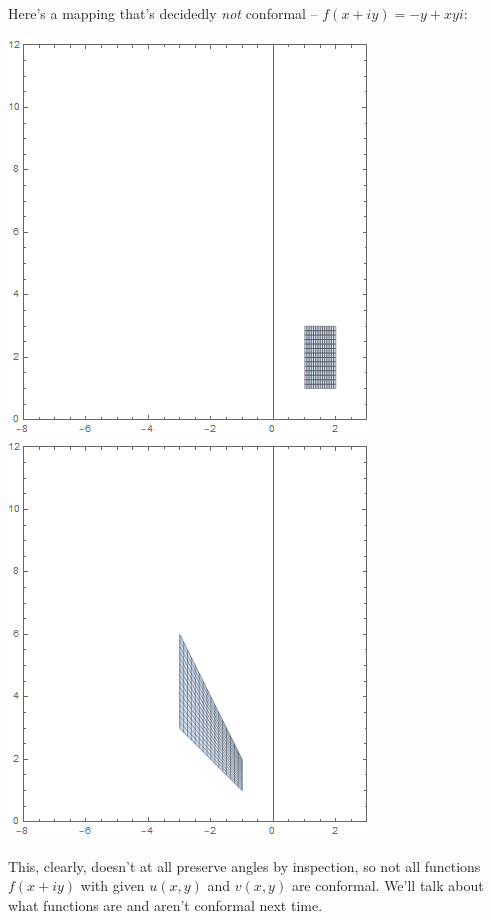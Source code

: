 \documentclass[12pt]{scrartcl}
\begin{document}
Here's a mapping that's decidedly \textit{not} conformal -- $f(x + iy) = -y + xyi$:
\begin{center}
	\includegraphics[scale=0.5]{images/domzsqr.png}
	\includegraphics[scale=0.5]{images/ranzsqr2.png}
\end{center}
This, clearly, doesn't at all preserve angles by inspection, so not all functions $f(x+iy)$ with given $u(x, y)$ and $v(x,y)$ are conformal. We'll talk about what functions are and aren't conformal next time.
\end{document}
